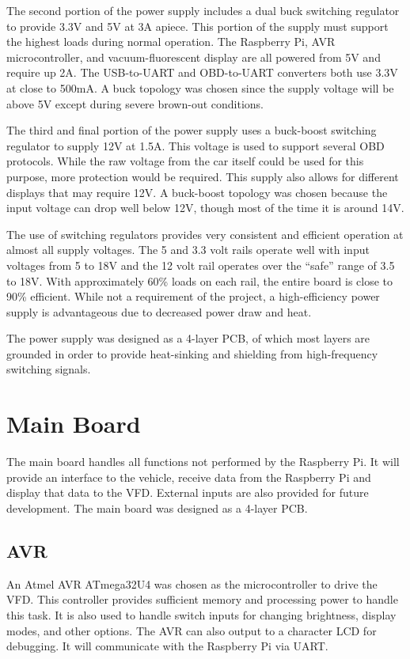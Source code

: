 The second portion of the power supply includes a dual buck switching regulator
to provide 3.3V and 5V at 3A apiece.  This portion of the supply must support 
the highest loads during normal operation.  The Raspberry Pi, AVR 
microcontroller, and vacuum-fluorescent display are all powered from 5V and 
require up 2A.  The USB-to-UART \cite{ft2232hds} and OBD-to-UART \cite{stn1110ds} converters both use 3.3V at 
close to 500mA.  A buck topology was chosen since the supply voltage will be
above 5V except during severe brown-out conditions.

The third and final portion of the power supply uses a buck-boost switching
regulator \cite{ltc3115ds} to supply 12V at 1.5A.  This voltage is used to support several
OBD protocols.  While the raw voltage from the car itself could be used
for this purpose, more protection would be required.  This supply also allows
for different displays that may require 12V.  A buck-boost topology was chosen
because the input voltage can drop well below 12V, though most of the time it is
around 14V.

The use of switching regulators provides very consistent and efficient operation
at almost all supply voltages.  The 5 and 3.3 volt rails operate well with input
voltages from 5 to 18V and the 12 volt rail operates over the ``safe'' range of
3.5 to 18V.  With approximately 60\% loads on each rail, the entire board is close
to 90\% efficient.  While not a requirement of the project, a high-efficiency power
supply is advantageous due to decreased power draw and heat.

The power supply was
designed as a 4-layer PCB, of which most layers are grounded in order to provide 
heat-sinking and shielding from high-frequency switching signals.

\section{Main Board}
The main board handles all functions not performed by the Raspberry Pi.  It will
provide an interface to the vehicle, receive data from the Raspberry Pi and 
display that data to the VFD.  External inputs are also provided for future 
development.  The main board was designed as a 4-layer PCB.

\subsection{AVR}
An Atmel AVR ATmega32U4 \cite{atmega32u4ds} was chosen as the microcontroller to drive the VFD.  This
controller provides sufficient memory and processing power to handle this task. 
It is also used to handle switch inputs for changing brightness, display modes,
and other options.  The AVR can also output to a character LCD
for debugging.  It will communicate with the Raspberry Pi via UART.

